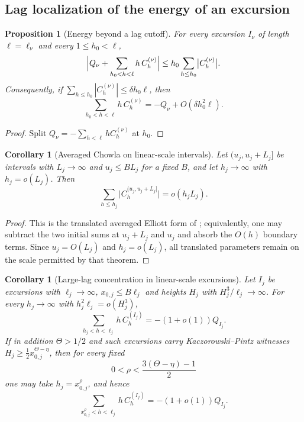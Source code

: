 \documentclass[11pt]{amsart}
\numberwithin{equation}{section}
\theoremstyle{plain}
\newtheorem{proposition}[theorem]{Proposition}
\newtheorem{corollary}[theorem]{Corollary}
\theoremstyle{definition}
\theoremstyle{remark}
\begin{document}
\subsection{Lag localization of the energy of an excursion}

\begin{proposition}[Energy beyond a lag cutoff]
\label{prop:lag-localization}
For every excursion $I_\nu$ of length $\ell=\ell_\nu$ and every
$1\le h_0<\ell$,
\[
\Bigl|Q_\nu+\sum_{h_0<h<\ell}h\,C^{(\nu)}_h\Bigr|
\le h_0\sum_{h\le h_0}\bigl|C^{(\nu)}_h\bigr| .
\]
Consequently, if $\sum_{h\le h_0}|C^{(\nu)}_h|\le\delta h_0\ell$, then
\[
\sum_{h_0<h<\ell}h\,C^{(\nu)}_h
=-Q_\nu+O(\delta h_0^2\ell).
\]
\end{proposition}

\begin{proof}
Split $Q_\nu=-\sum_{h<\ell}hC^{(\nu)}_h$ at $h_0$.
\end{proof}

\begin{corollary}[Averaged Chowla on linear-scale intervals]
\label{cor:chowla-linear}
Let $(u_j,u_j+L_j]$ be intervals with $L_j\to\infty$ and $u_j\le BL_j$ for a
fixed $B$, and let $h_j\to\infty$ with $h_j=o(L_j)$. Then
\[
\sum_{h\le h_j}\bigl|C^{(u_j,u_j+L_j]}_h\bigr|=o(h_jL_j).
\]
\end{corollary}

\begin{proof}
This is the translated averaged Elliott form of \cite{MRT15}; equivalently,
one may subtract the two initial sums at $u_j+L_j$ and $u_j$ and absorb the
$O(h)$ boundary terms. Since $u_j=O(L_j)$ and $h_j=o(L_j)$, all translated
parameters remain on the scale permitted by that theorem.
\end{proof}

\begin{corollary}[Large-lag concentration in linear-scale excursions]
\label{cor:large-lag}
Let $I_j$ be excursions with $\ell_j\to\infty$, $x_{0,j}\le B\ell_j$ and
heights $H_j$ with $H_j^3/\ell_j\to\infty$. For every $h_j\to\infty$ with
$h_j^2\ell_j=o(H_j^3)$,
\[
\sum_{h_j<h<\ell_j}h\,C^{(I_j)}_h=-(1+o(1))Q_{I_j}.
\]
If in addition $\Theta>1/2$ and such excursions carry
Kaczorowski--Pintz witnesses
$H_j\ge\frac12x_{0,j}^{\Theta-\eta}$, then for every fixed
\[
0<\rho<\frac{3(\Theta-\eta)-1}{2}
\]
one may take $h_j=x_{0,j}^{\rho}$, and hence
\[
\sum_{x_{0,j}^{\rho}<h<\ell_j}h\,C_h^{(I_j)}=-(1+o(1))Q_{I_j}.
\]
\end{corollary}
\end{document}
